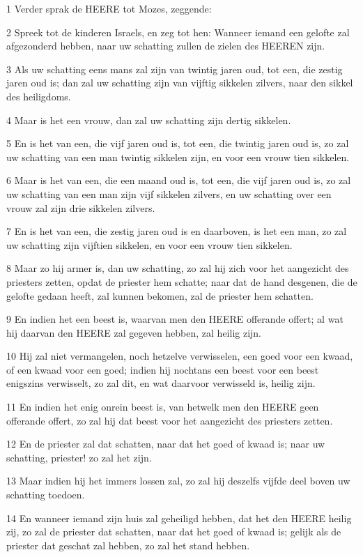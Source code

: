 \par 1 Verder sprak de HEERE tot Mozes, zeggende:
\par 2 Spreek tot de kinderen Israels, en zeg tot hen: Wanneer iemand een gelofte zal afgezonderd hebben, naar uw schatting zullen de zielen des HEEREN zijn.
\par 3 Als uw schatting eens mans zal zijn van twintig jaren oud, tot een, die zestig jaren oud is; dan zal uw schatting zijn van vijftig sikkelen zilvers, naar den sikkel des heiligdoms.
\par 4 Maar is het een vrouw, dan zal uw schatting zijn dertig sikkelen.
\par 5 En is het van een, die vijf jaren oud is, tot een, die twintig jaren oud is, zo zal uw schatting van een man twintig sikkelen zijn, en voor een vrouw tien sikkelen.
\par 6 Maar is het van een, die een maand oud is, tot een, die vijf jaren oud is, zo zal uw schatting van een man zijn vijf sikkelen zilvers, en uw schatting over een vrouw zal zijn drie sikkelen zilvers.
\par 7 En is het van een, die zestig jaren oud is en daarboven, is het een man, zo zal uw schatting zijn vijftien sikkelen, en voor een vrouw tien sikkelen.
\par 8 Maar zo hij armer is, dan uw schatting, zo zal hij zich voor het aangezicht des priesters zetten, opdat de priester hem schatte; naar dat de hand desgenen, die de gelofte gedaan heeft, zal kunnen bekomen, zal de priester hem schatten.
\par 9 En indien het een beest is, waarvan men den HEERE offerande offert; al wat hij daarvan den HEERE zal gegeven hebben, zal heilig zijn.
\par 10 Hij zal niet vermangelen, noch hetzelve verwisselen, een goed voor een kwaad, of een kwaad voor een goed; indien hij nochtans een beest voor een beest enigszins verwisselt, zo zal dit, en wat daarvoor verwisseld is, heilig zijn.
\par 11 En indien het enig onrein beest is, van hetwelk men den HEERE geen offerande offert, zo zal hij dat beest voor het aangezicht des priesters zetten.
\par 12 En de priester zal dat schatten, naar dat het goed of kwaad is; naar uw schatting, priester! zo zal het zijn.
\par 13 Maar indien hij het immers lossen zal, zo zal hij deszelfs vijfde deel boven uw schatting toedoen.
\par 14 En wanneer iemand zijn huis zal geheiligd hebben, dat het den HEERE heilig zij, zo zal de priester dat schatten, naar dat het goed of kwaad is; gelijk als de priester dat geschat zal hebben, zo zal het stand hebben.
